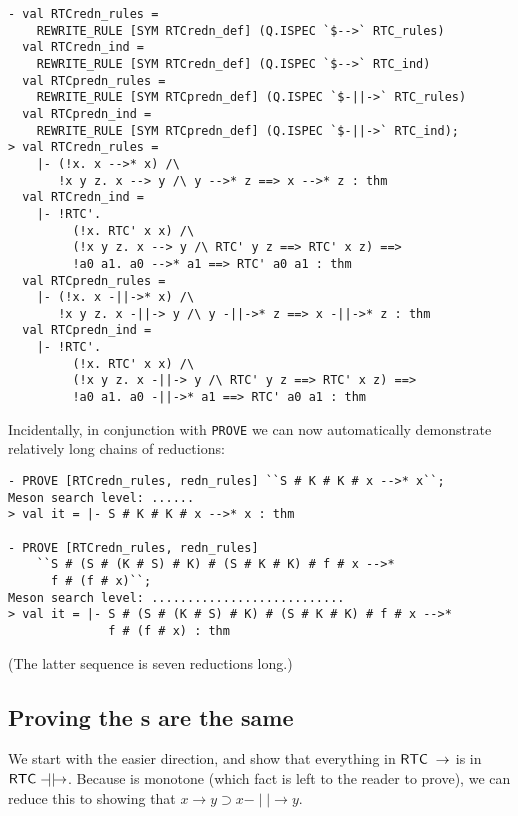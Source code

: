 \documentclass[12pt]{article}
\newcommand{\mathpredn}{\mathbin{-\!\!\!\mid\mid\!\rightarrow}}
\begin{document}
\begin{session}\begin{verbatim}
- val RTCredn_rules =
    REWRITE_RULE [SYM RTCredn_def] (Q.ISPEC `$-->` RTC_rules)
  val RTCredn_ind =
    REWRITE_RULE [SYM RTCredn_def] (Q.ISPEC `$-->` RTC_ind)
  val RTCpredn_rules =
    REWRITE_RULE [SYM RTCpredn_def] (Q.ISPEC `$-||->` RTC_rules)
  val RTCpredn_ind =
    REWRITE_RULE [SYM RTCpredn_def] (Q.ISPEC `$-||->` RTC_ind);
> val RTCredn_rules =
    |- (!x. x -->* x) /\
       !x y z. x --> y /\ y -->* z ==> x -->* z : thm
  val RTCredn_ind =
    |- !RTC'.
         (!x. RTC' x x) /\
         (!x y z. x --> y /\ RTC' y z ==> RTC' x z) ==>
         !a0 a1. a0 -->* a1 ==> RTC' a0 a1 : thm
  val RTCpredn_rules =
    |- (!x. x -||->* x) /\
       !x y z. x -||-> y /\ y -||->* z ==> x -||->* z : thm
  val RTCpredn_ind =
    |- !RTC'.
         (!x. RTC' x x) /\
         (!x y z. x -||-> y /\ RTC' y z ==> RTC' x z) ==>
         !a0 a1. a0 -||->* a1 ==> RTC' a0 a1 : thm
\end{verbatim}\end{session}
Incidentally, in conjunction with \texttt{PROVE} we can now
automatically demonstrate relatively long chains of reductions:
\begin{session}\begin{verbatim}
- PROVE [RTCredn_rules, redn_rules] ``S # K # K # x -->* x``;
Meson search level: ......
> val it = |- S # K # K # x -->* x : thm

- PROVE [RTCredn_rules, redn_rules]
    ``S # (S # (K # S) # K) # (S # K # K) # f # x -->*
      f # (f # x)``;
Meson search level: ...........................
> val it = |- S # (S # (K # S) # K) # (S # K # K) # f # x -->*
              f # (f # x) : thm
\end{verbatim}\end{session}
(The latter sequence is seven reductions long.)


\subsection{Proving the s are the same}
\label{sec:Proving-RTCs-same}

We start with the easier direction, and show that everything in
${\sf RTC}\;\rightarrow$ is in $\con{RTC}\;\mathpredn$.  Because
\con{RTC} is monotone (which fact is left to the reader to prove),
we can reduce this to showing that $x\rightarrow y\supset
x\mathpredn y$.
\end{document}
